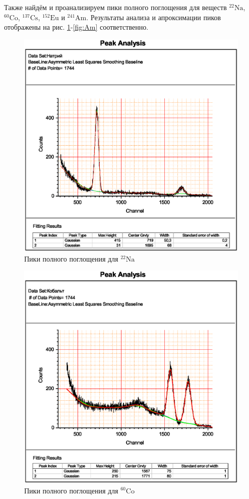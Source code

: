 \documentclass[a4paper]{article}
\newcommand{\isotope}[2]{$ ^{#2}\mathrm{#1} $}
\begin{document}
Также найдём и проанализируем пики полного поглощения для веществ \isotope{Na}{22}, \isotope{Co}{60}, \isotope{Cs}{137}, \isotope{Eu}{152} и \isotope{Am}{241}. Результаты анализа и апроксимации пиков отображены на рис. \ref{fig:Na}-\ref{fig:Am} соответственно.
\begin{figure}
	\centering
	\includegraphics[width=0.7\linewidth]{"1"}
	\caption{Пики полного поглощения для \isotope{Na}{22}}
	\label{fig:Na}
\end{figure}
\begin{figure}
	\centering
	\includegraphics[width=0.7\linewidth]{"2"}
	\caption{Пики полного поглощения для \isotope{Co}{60}}
	\label{fig:Co}
\end{figure}
\end{document}
